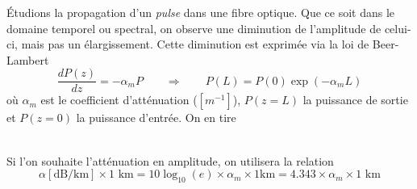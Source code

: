 	Étudions la propagation d'un \textit{pulse} dans une fibre optique. Que ce soit dans le 
	domaine temporel ou spectral, on observe une diminution de l'amplitude de celui-ci, mais
	pas un élargissement. Cette diminution est exprimée via la loi de Beer-Lambert
	\begin{equation}
	\dfrac{dP(z)}{dz} = -\alpha_mP\qquad\Rightarrow\qquad P(L) = P(0)\exp(-\alpha_mL)
	\end{equation}
	où $\alpha_m$ est le coefficient d'atténuation ($[m^{-1}]$), $P(z=L)$ la puissance de 
	sortie et $P(z=0)$ la puissance d'entrée. On en tire\\
	
	\ 
	
	Si l'on souhaite l'atténuation en amplitude, on utilisera la relation
	\begin{equation}
	\alpha[\text{dB/km}]\times\text{1 km} = 10\log_{10}(e)\times\alpha_m\times1\text{km} = 
	4.343\times\alpha_m\times\text{1 km}
	\end{equation}

